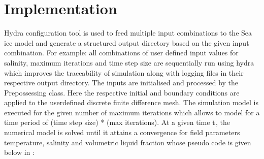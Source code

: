 \documentclass[a4paper,11pt,english,openany]{sphinxmanual}
\begin{document}
\section{Implementation}
\label{\detokenize{report/implementation:implementation}}\label{\detokenize{report/implementation::doc}}
\sphinxAtStartPar
Hydra configuration tool is used to feed multiple input combinations to the Sea ice model and generate a structured output directory based on the given input combination. For example: all combinations of user defined input values for salinity,
maximum iterations and time step size are sequentially run using hydra which improves the traceability of simulation along with
logging files in their respective output directory. The inputs are initialised and processed by the Prepossessing class. Here the
respective initial and boundary conditions are applied to the user\sphinxhyphen{}defined discrete finite difference mesh. The simulation model
is executed for the given number of maximum iterations which allows to model for a time period of (time step size) * (max iterations). At a given time \($t$\), the numerical model is solved until it attains a convergence for field parameters temperature, salinity and volumetric liquid fraction whose pseudo code is given below in :
\def\sphinxLiteralBlockLabel{\label{\detokenize{report/implementation:id1}}}
\end{document}
